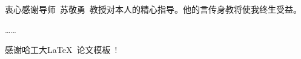\begin{acknowledgements}
衷心感谢导师~苏敬勇~教授对本人的精心指导。他的言传身教将使我终生受益。

……

感谢哈工大\LaTeX\ 论文模板\hithesis\ !

\end{acknowledgements}
